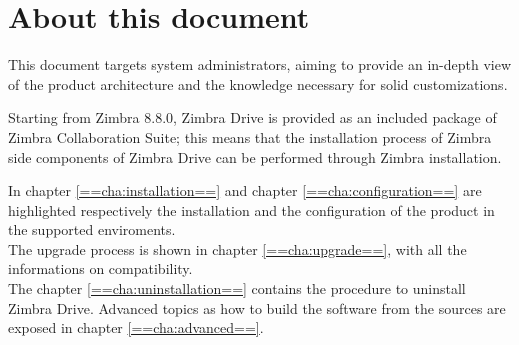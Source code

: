 \section{About this document}
This document targets system administrators, aiming to provide an in-depth view of the product architecture
and the knowledge necessary for solid customizations.
\begin{info}
    Starting from Zimbra 8.8.0, Zimbra Drive is provided as an included package of Zimbra Collaboration Suite;
    this means that the installation process of Zimbra side components of Zimbra Drive can be performed 
    through Zimbra installation.
\end{info}
In chapter \ref{==cha:installation==} and chapter \ref{==cha:configuration==} are highlighted respectively the installation
and the configuration of the product in the supported enviroments.\\
The upgrade process is shown in chapter \ref{==cha:upgrade==}, with all the informations on compatibility.\\
The chapter \ref{==cha:uninstallation==} contains the procedure to uninstall Zimbra Drive.
Advanced topics as how to build the software from the sources are exposed in chapter \ref{==cha:advanced==}.